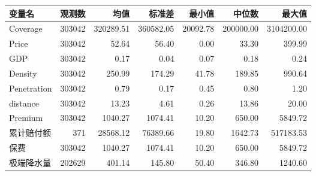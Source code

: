 \begin{tabular}{lrrrrrr}
    \toprule
    变量名         & 观测数    & 均值        & 标准差       & 最小值      & 中位数       & 最大值        \\
    \midrule
    Coverage    & 303042 & 320289.51 & 360582.05 & 20092.78 & 200000.00 & 3104200.00 \\
    Price       & 303042 & 52.64     & 56.40     & 0.00     & 33.30     & 399.99     \\
    GDP         & 303042 & 0.17      & 0.04      & 0.07     & 0.18      & 0.24       \\
    Density     & 303042 & 250.99    & 174.29    & 41.78    & 189.85    & 990.64     \\
    Penetration & 303042 & 0.79      & 0.17      & 0.45     & 0.80      & 1.20       \\
    distance    & 303042 & 13.23     & 4.61      & 0.26     & 13.86     & 20.00      \\
    Premium     & 303042 & 1040.27   & 1074.41   & 10.20    & 650.00    & 5849.72    \\
    累计赔付额       & 371    & 28568.12  & 76389.66  & 19.80    & 1642.73   & 517183.53  \\
    保费          & 303042 & 1040.27   & 1074.41   & 10.20    & 650.00    & 5849.72    \\
    极端降水量       & 202629 & 401.14    & 145.80    & 50.40    & 346.80    & 1240.60    \\
    \bottomrule
\end{tabular}
